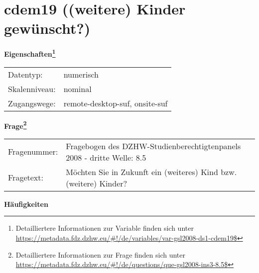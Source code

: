 
    \setcounter{footnote}{0}

    \vspace*{-1.8cm}
	\section{cdem19 ((weitere) Kinder gewünscht?)}
	\label{section:cdem19}



    \vspace*{0.5cm}
    \noindent\textbf{Eigenschaften\footnote{Detailliertere Informationen zur Variable finden sich unter
		\url{https://metadata.fdz.dzhw.eu/\#!/de/variables/var-gsl2008-ds1-cdem19$}}}\\
	\begin{tabularx}{\hsize}{@{}lX}
	Datentyp: & numerisch \\
	Skalenniveau: & nominal \\
	Zugangswege: &
	  remote-desktop-suf, 
	  onsite-suf
 \\
    \end{tabularx}



				\vspace*{0.5cm}
                \noindent\textbf{Frage\footnote{Detailliertere Informationen zur Frage finden sich unter
		              \url{https://metadata.fdz.dzhw.eu/\#!/de/questions/que-gsl2008-ins3-8.5$}}}\\
				\begin{tabularx}{\hsize}{@{}lX}
					Fragenummer: &
					  Fragebogen des DZHW-Studienberechtigtenpanels 2008 - dritte Welle:
					  8.5
 \\
					Fragetext: & Möchten Sie in Zukunft ein (weiteres) Kind bzw. (weitere) Kinder? \\
				\end{tabularx}





        		\vspace*{0.5cm}
                \noindent\textbf{Häufigkeiten}

